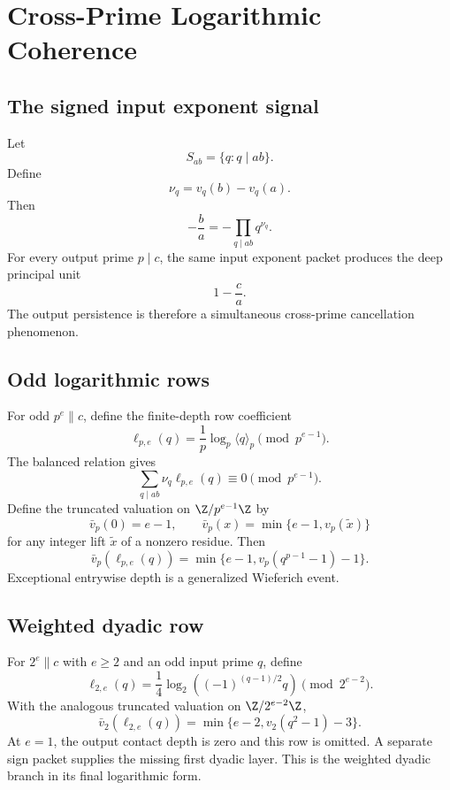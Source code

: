 \section{Cross-Prime Logarithmic Coherence}

\subsection{The signed input exponent signal}
Let
\[
 S_{ab}=\{q:q\mid ab\}.
\]
Define
\[
 \nu_q=v_q(b)-v_q(a).
\]
Then
\[
 -\frac ba=-\prod_{q\mid ab}q^{\nu_q}.
\]
For every output prime $p\mid c$, the same input exponent packet produces the deep principal unit
\[
 1-\frac ca.
\]
The output persistence is therefore a simultaneous cross-prime cancellation phenomenon.

\subsection{Odd logarithmic rows}
For odd $p^e\parallel c$, define the finite-depth row coefficient
\[
 \ell_{p,e}(q)
 =
 \frac1p\log_p\langle q\rangle_p
 \pmod{p^{e-1}}.
\]
The balanced relation gives
\[
 \boxed{
 \sum_{q\mid ab}
 \nu_q\ell_{p,e}(q)
 \equiv0
 \pmod{p^{e-1}}.
 }
\]
Define the truncated valuation on $\Z/p^{e-1}\Z$ by
\[
 \bar v_p(0)=e-1,
 \qquad
 \bar v_p(x)=\min\{e-1,v_p(\widetilde x)\}
\]
for any integer lift $\widetilde x$ of a nonzero residue. Then
\[
 \boxed{
 \bar v_p(\ell_{p,e}(q))
 =
 \min\{e-1,v_p(q^{p-1}-1)-1\}.
 }
\]
Exceptional entrywise depth is a generalized Wieferich event.

\subsection{Weighted dyadic row}
For $2^e\parallel c$ with $e\ge2$ and an odd input prime $q$, define
\[
 \ell_{2,e}(q)
 =
 \frac14
 \log_2\left((-1)^{(q-1)/2}q\right)
 \pmod{2^{e-2}}.
\]
With the analogous truncated valuation on $\Z/2^{e-2}\Z$,
\[
 \bar v_2(\ell_{2,e}(q))
 =
 \min\{e-2,v_2(q^2-1)-3\}.
\]
At $e=1$, the output contact depth is zero and this row is omitted. A separate sign packet supplies the missing first dyadic layer. This is the weighted dyadic branch in its final logarithmic form.

